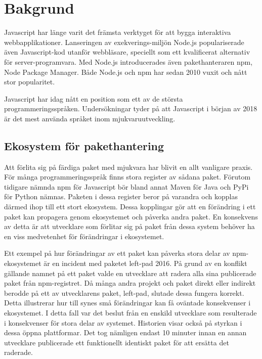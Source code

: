 \section{Bakgrund}
\label{sec:joel_o-background}

Javascript har länge varit det främsta verktyget för att bygga interaktiva webbapplikationer. Lanseringen av exekverings-miljön Node.js\cite{node-about} populariserade även Javascript-kod utanför webbläsare, speciellt som ett kvalificerat alternativ för server-programvara. Med Node.js introducerades även pakethanteraren npm, Node Package Manager. Både Node.js och npm har sedan 2010 vuxit och nått stor popularitet. \cite{node-timeline}

Javascript har idag nått en position som ett av de största programmeringsspråken. Undersökningar tyder på att Javascript i början av 2018 är det mest använda språket inom mjukvaruutveckling.\cite{githut}\cite{so-survey}

\subsection{Ekosystem för pakethantering}
Att förlita sig på färdiga paket med mjukvara har blivit en allt vanligare praxis. För många programmeringsspråk finns stora register av sådana paket. Förutom tidigare nämnda npm för Javascript bör bland annat Maven för Java och PyPi för Python nämnas. Paketen i dessa register beror på varandra och kopplas därmed ihop till ett stort ekosystem. Dessa kopplingar gör att en förändring i ett paket kan propagera genom ekosystemet och påverka andra paket. En konsekvens av detta är att utvecklare som förlitar sig på paket från dessa system behöver ha en viss medvetenhet för förändringar i ekosystemet.\cite{Henry2017}

Ett exempel på hur förändringar av ett paket kan påverka stora delar av npm-ekosystemet är en incident med paketet left-pad 2016. På grund av en konflikt gällande namnet på ett paket valde en utvecklare att radera alla sina publicerade paket från npm-registret. Då många andra projekt och paket direkt eller indirekt berodde på ett av utvecklarens paket, left-pad, slutade dessa fungera korrekt. Detta illustrerar hur till synes små förändringar kan få oväntade konsekvenser i ekosystemet. I detta fall var det beslut från en enskild utvecklare som resulterade i konsekvenser för stora delar av systemet. Historien visar också på styrkan i dessa öppna plattformar. Det tog nämligen endast 10 minuter innan en annan utvecklare publicerade ett funktionellt identiskt paket för att ersätta det raderade.\cite{npm-left-pad}

